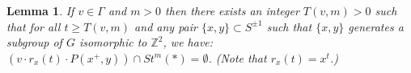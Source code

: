 \documentclass[12pt]{article}
\newtheorem{lemma}[theorem]{Lemma}
\newenvironment{proof}{\addvspace{12pt}\noindent{\bf Proof:}}{
$\Box$\par\addvspace{12pt}}
\numberwithin{equation}{section}
\begin{document}



\begin{lemma}\label{L5}
If $v\in \Gamma$ and $m>0$ then there exists an integer $T(v,m)>0$ such that for all $t\geq T(v,m)$ and any pair $\{x,y\}\subset S^{\pm 1}$ such that $\{x,y\}$ generates a subgroup of $G$ isomorphic to $\mathbb Z^2$, we have:
$(v\cdot r_x(t)\cdot P(x^+,y))\cap St^m(\ast)=\emptyset$. (Note that $r_x(t)=x^t$.)
\end{lemma}
\end{document}
